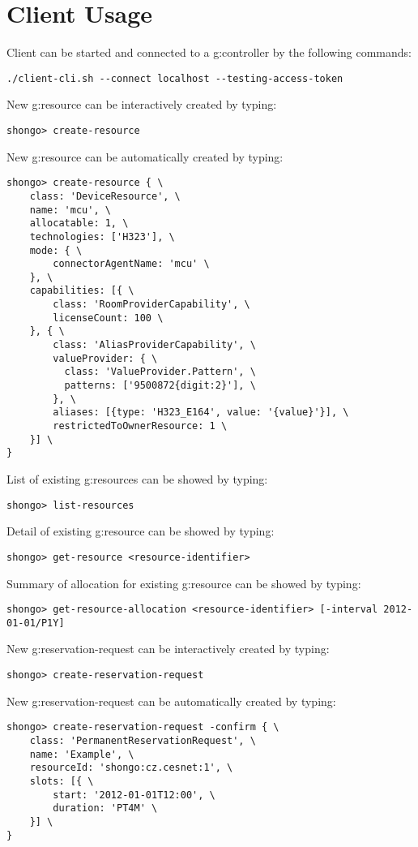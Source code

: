 \appendix



\chapter{Client Usage}

Client can be started and connected to a \gls{g:controller} by the following commands:
\begin{verbatim}
./client-cli.sh --connect localhost --testing-access-token
\end{verbatim}
New \gls{g:resource} can be interactively created by typing:
\begin{verbatim}
shongo> create-resource
\end{verbatim}
New \gls{g:resource} can be automatically created by typing:
\begin{verbatim}
shongo> create-resource { \
    class: 'DeviceResource', \
    name: 'mcu', \
    allocatable: 1, \
    technologies: ['H323'], \
    mode: { \
        connectorAgentName: 'mcu' \
    }, \
    capabilities: [{ \
        class: 'RoomProviderCapability', \
        licenseCount: 100 \
    }, { \
        class: 'AliasProviderCapability', \
        valueProvider: { \
          class: 'ValueProvider.Pattern', \
          patterns: ['9500872{digit:2}'], \
        }, \
        aliases: [{type: 'H323_E164', value: '{value}'}], \
        restrictedToOwnerResource: 1 \
    }] \
}
\end{verbatim}
List of existing \glspl{g:resource} can be showed by typing:
\begin{verbatim}
shongo> list-resources
\end{verbatim}
Detail of existing \gls{g:resource} can be showed by typing:
\begin{verbatim}
shongo> get-resource <resource-identifier>
\end{verbatim}
Summary of allocation for existing \gls{g:resource} can be showed by typing:
\begin{verbatim}
shongo> get-resource-allocation <resource-identifier> [-interval 2012-01-01/P1Y]
\end{verbatim}
New \gls{g:reservation-request} can be interactively created by typing:
\begin{verbatim}
shongo> create-reservation-request
\end{verbatim}
New \gls{g:reservation-request} can be automatically created by typing:
\begin{verbatim}
shongo> create-reservation-request -confirm { \
    class: 'PermanentReservationRequest', \
    name: 'Example', \
    resourceId: 'shongo:cz.cesnet:1', \
    slots: [{ \
        start: '2012-01-01T12:00', \
        duration: 'PT4M' \
    }] \
}
\end{verbatim}

